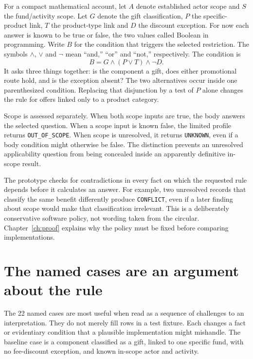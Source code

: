 
For a compact mathematical account, let $A$ denote established actor scope and
$S$ the fund/activity scope. Let $G$ denote the gift classification, $P$ the
specific-product link, $T$ the product-type link and $D$ the discount exception.
For now each answer is known to be true or false, the two values called Boolean
in programming. Write $B$ for the condition that triggers the selected
restriction. The symbols $\land$, $\lor$ and $\neg$ mean ``and,'' ``or'' and
``not,'' respectively. The condition is
\begin{equation}
 B=G\land(P\lor T)\land\neg D.
 \label{eq:gift-body}
\end{equation}
It asks three things together: is the component a gift, does either promotional
route hold, and is the exception absent? The two alternatives occur inside one
parenthesized condition. Replacing that disjunction by a test of $P$ alone
changes the rule for offers linked only to a product category.

Scope is assessed separately. When both scope inputs are true, the body answers
the selected question. When a scope input is known false, the limited profile
returns \texttt{OUT\_OF\_SCOPE}. When scope is unresolved, it returns
\texttt{UNKNOWN}, even if a body condition might otherwise be false. The
distinction prevents an unresolved applicability question from being concealed
inside an apparently definitive in-scope result.

The prototype checks for contradictions in every fact on which the requested
rule depends before it calculates an answer. For example, two unresolved records
that classify the same benefit differently produce \texttt{CONFLICT}, even if a
later finding about scope would make that classification irrelevant. This is a
deliberately conservative software policy, not wording taken from the circular.
Chapter~\ref{ch:proof} explains why the policy must be fixed before comparing
implementations.

\section{The named cases are an argument about the rule}
\label{merge:M02:03}

\label{sec:circular-cases}
The 22 named cases are most useful when read as a sequence of challenges to an
interpretation. They do not merely fill rows in a test fixture. Each changes a
fact or evidentiary condition that a plausible implementation might mishandle.
The baseline case is a component classified as a gift, linked to one specific
fund, with no fee-discount exception, and known in-scope actor and activity.

